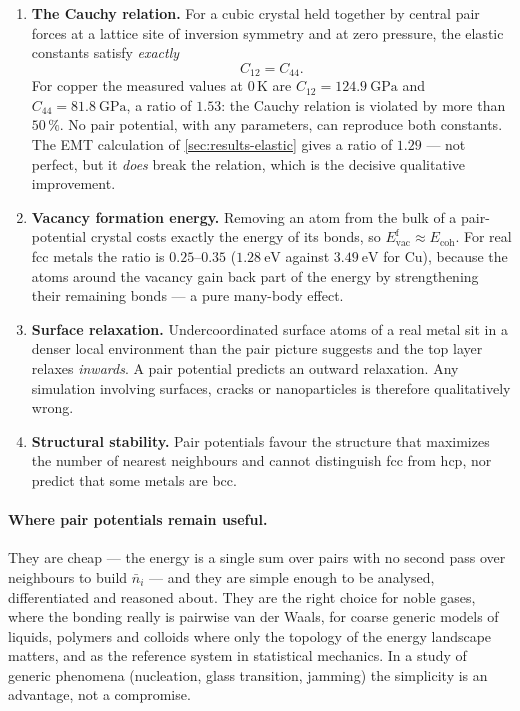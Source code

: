 \documentclass[11pt,a4paper]{article}
\numberwithin{equation}{section}
\theoremstyle{remark}
\begin{document}
\begin{enumerate}\setlength{\itemsep}{3pt}
  \item \textbf{The Cauchy relation.} For a cubic crystal held together by central pair forces at a
    lattice site of inversion symmetry and at zero pressure, the elastic constants satisfy
    \emph{exactly}
    \begin{equation}\label{eq:cauchy}
      C_{12} = C_{44}.
    \end{equation}
    For copper the measured values at 0\,K are
    $C_{12} = \SI{124.9}{\giga\pascal}$ and $C_{44} = \SI{81.8}{\giga\pascal}$, a ratio of $1.53$: the
    Cauchy relation is violated by more than $50\,\%$. No pair potential, with any parameters, can
    reproduce both constants. The EMT calculation of \cref{sec:results-elastic} gives a ratio of
    $1.29$ --- not perfect, but it \emph{does} break the relation, which is the decisive qualitative
    improvement.
  \item \textbf{Vacancy formation energy.} Removing an atom from the bulk of a pair-potential crystal
    costs exactly the energy of its bonds, so $E^{\mathrm{f}}_{\mathrm{vac}} \approx E_{\mathrm{coh}}$.
    For real fcc metals the ratio is $0.25$--$0.35$ ($\SI{1.28}{\electronvolt}$ against
    $\SI{3.49}{\electronvolt}$ for Cu), because the atoms around the vacancy gain back part of the
    energy by strengthening their remaining bonds --- a pure many-body effect.
  \item \textbf{Surface relaxation.} Undercoordinated surface atoms of a real metal sit in a denser
    local environment than the pair picture suggests and the top layer relaxes \emph{inwards}. A pair
    potential predicts an outward relaxation. Any simulation involving surfaces, cracks or
    nanoparticles is therefore qualitatively wrong.
  \item \textbf{Structural stability.} Pair potentials favour the structure that maximizes the number
    of nearest neighbours and cannot distinguish fcc from hcp, nor predict that some metals are bcc.
\end{enumerate}

\paragraph{Where pair potentials remain useful.}
They are cheap --- the energy is a single sum over pairs with no second pass over neighbours to build
$\bar n_i$ --- and they are simple enough to be analysed, differentiated and reasoned about. They are
the right choice for noble gases, where the bonding really is pairwise van der Waals, for coarse
generic models of liquids, polymers and colloids where only the topology of the energy landscape
matters, and as the reference system in statistical mechanics. In a study of generic phenomena
(nucleation, glass transition, jamming) the simplicity is an advantage, not a compromise.
\end{document}
